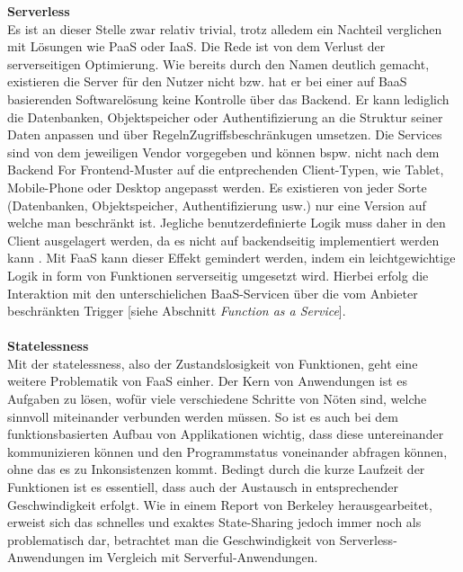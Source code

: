 \documentclass[11pt]{article}
\begin{document}
\glqq \textbf{Serverless}\grqq{}\\
Es ist an dieser Stelle zwar relativ trivial, trotz alledem ein Nachteil verglichen mit Lösungen wie PaaS oder IaaS. Die Rede ist von dem Verlust der serverseitigen Optimierung. Wie bereits durch den Namen deutlich gemacht, existieren die Server für den Nutzer nicht bzw. hat er bei einer auf BaaS basierenden Softwarelösung keine Kontrolle über das Backend. Er kann lediglich die Datenbanken, Objektspeicher oder Authentifizierung an die Struktur seiner Daten anpassen und über \glqq Regeln\grqq{}Zugriffsbeschränkugen umsetzen. Die Services sind von dem jeweiligen Vendor vorgegeben und können bspw. nicht nach dem \glqq Backend For Frontend\grqq{}-Muster \cite{sam2015bff} auf die entprechenden Client-Typen, wie Tablet, Mobile-Phone oder Desktop angepasst werden. Es existieren von jeder Sorte (Datenbanken, Objektspeicher, Authentifizierung usw.) nur eine Version auf welche man beschränkt ist. Jegliche benutzerdefinierte Logik muss daher in den Client ausgelagert werden, da es nicht auf backendseitig implementiert werden kann \cite{fowler2018serverless}. Mit FaaS kann dieser Effekt gemindert werden, indem ein leichtgewichtige Logik in form von Funktionen serverseitig umgesetzt wird. Hierbei erfolg die Interaktion mit den unterschielichen BaaS-Servicen über die vom Anbieter beschränkten Trigger [siehe Abschnitt \textit{Function as a Service}]. \\\\
\glqq \textbf{Statelessness}\grqq{}\\
Mit der \glqq statelessness\grqq{}, also der Zustandslosigkeit von Funktionen, geht eine weitere Problematik von FaaS einher. Der Kern von Anwendungen ist es Aufgaben zu lösen, wofür viele verschiedene Schritte von Nöten sind, welche sinnvoll miteinander verbunden werden müssen. So ist es auch bei dem funktionsbasierten Aufbau von Applikationen wichtig, dass diese untereinander kommunizieren können und den Programmstatus voneinander abfragen können, ohne das es zu Inkonsistenzen kommt. Bedingt durch die kurze Laufzeit der Funktionen ist es essentiell, dass auch der Austausch in entsprechender Geschwindigkeit erfolgt. Wie in einem Report von Berkeley \cite{jonas2019cloud} herausgearbeitet, erweist sich das schnelles und exaktes \glqq State-Sharing\grqq{} jedoch immer noch als problematisch dar, betrachtet man die Geschwindigkeit von \glqq Serverless\grqq{}-Anwendungen im Vergleich mit \glqq Serverful\grqq{}-Anwendungen. \\\\
\end{document}
